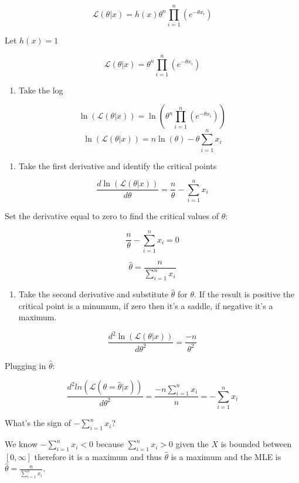 \documentclass[
]{article}
\providecommand{\tightlist}{%
  \setlength{\itemsep}{0pt}\setlength{\parskip}{0pt}}
\begin{document}
\[\mathcal{L}(\theta|x)=h(x)\theta^n\prod_{i=1}^n( e^{-\theta x_i})\]

Let \(h(x)=1\)

\[\mathcal{L}(\theta|x)=\theta^n\prod_{i=1}^n( e^{-\theta x_i})\]

\begin{enumerate}
\def\labelenumi{\arabic{enumi}.}
\setcounter{enumi}{2}
\tightlist
\item
  Take the log
\end{enumerate}

\[\ln(\mathcal{L}(\theta|x))=\ln(\theta^n\prod_{i=1}^n( e^{-\theta x_i}))\]
\[\ln(\mathcal{L}(\theta|x))=n\ln(\theta)-\theta\sum_{i=1}^nx_i\]

\begin{enumerate}
\def\labelenumi{\arabic{enumi}.}
\setcounter{enumi}{3}
\tightlist
\item
  Take the first derivative and identify the critical points
\end{enumerate}

\[\frac{d\ln(\mathcal{L}(\theta|x))}{d\theta}=\frac{n}{\theta}-\sum_{i=1}^nx_i\]

Set the derivative equal to zero to find the critical values of
\(\theta\):

\[\frac{n}{\theta}-\sum_{i=1}^nx_i=0\]

\[\hat{\theta}=\frac{n}{\sum_{i=1}^nx_i}\]

\begin{enumerate}
\def\labelenumi{\arabic{enumi}.}
\setcounter{enumi}{4}
\tightlist
\item
  Take the second derivative and substitute \(\hat{\theta}\) for
  \(\theta\). If the result is positive the critical point is a minumum,
  if zero then it's a saddle, if negative it's a maximum.
\end{enumerate}

\[\frac{d^2\ln(\mathcal{L}(\theta|x))}{d\theta^2}=\frac{-n}{\theta^2}\]

Plugging in \(\hat{\theta}\):

\[\frac{d^2ln(\mathcal{L}(\theta=\hat{\theta}|x))}{d\theta^2}=\frac{-n\sum_{i=1}^nx_i}{n}=-\sum_{i=1}^nx_i\]

What's the sign of \(-\sum_{i=1}^nx_i\)?

We know \(-\sum_{i=1}^nx_i<0\) because \(\sum_{i=1}^nx_i>0\) given the
\(X\) is bounded between \([0, \infty]\) therefore it is a maximum and
thus \(\hat{\theta}\) is a maximum and the MLE is
\(\hat{\theta}=\frac{n}{\sum_{i=1}^nx_i}\).
\end{document}

